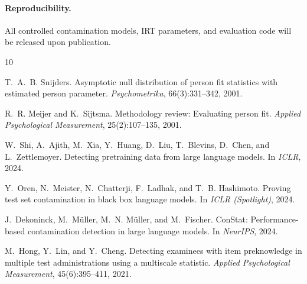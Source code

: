 \documentclass[11pt,a4paper]{article}
\begin{document}
\paragraph{Reproducibility.}
All controlled contamination models, IRT parameters, and evaluation code will be released upon publication.



\begin{thebibliography}{10}

T.~A.~B. Snijders.
\newblock Asymptotic null distribution of person fit statistics with estimated person parameter.
\newblock \emph{Psychometrika}, 66(3):331--342, 2001.

R.~R. Meijer and K.~Sijtsma.
\newblock Methodology review: Evaluating person fit.
\newblock \emph{Applied Psychological Measurement}, 25(2):107--135, 2001.

W.~Shi, A.~Ajith, M.~Xia, Y.~Huang, D.~Liu, T.~Blevins, D.~Chen, and L.~Zettlemoyer.
\newblock Detecting pretraining data from large language models.
\newblock In \emph{ICLR}, 2024.

Y.~Oren, N.~Meister, N.~Chatterji, F.~Ladhak, and T.~B. Hashimoto.
\newblock Proving test set contamination in black box language models.
\newblock In \emph{ICLR (Spotlight)}, 2024.

J.~Dekoninck, M.~Müller, M.~N. Müller, and M.~Fischer.
\newblock ConStat: Performance-based contamination detection in large language models.
\newblock In \emph{NeurIPS}, 2024.

M.~Hong, Y.~Lin, and Y.~Cheng.
\newblock Detecting examinees with item preknowledge in multiple test administrations using a multiscale statistic.
\newblock \emph{Applied Psychological Measurement}, 45(6):395--411, 2021.

\end{thebibliography}
\end{document}
